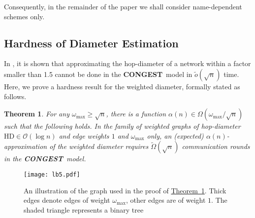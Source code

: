 \documentclass[letterpaper,11pt]{article}
\newcommand{\namedref}[2]{\hyperref[#2]{#1~\ref*{#2}}}
\newcommand{\theoremref}[1]{\namedref{Theorem}{#1}}
\newtheorem{theorem}{Theorem}[section]
\newcommand{\BO}{\mathcal{O}}
\newcommand{\CONGEST}{\textbf{CONGEST}}
\newcommand{\HD}{\mathrm{HD}}
\begin{document}
Consequently, in the remainder of the paper we shall consider
name-dependent schemes only.


\subsection{Hardness of Diameter Estimation}
\label{sec:lb_diam}

In \cite{FHW-12}, it is shown that approximating the hop-diameter of a
network within a factor smaller than 1.5 cannot be done in the \CONGEST\ model
in $\tilde o(\sqrt n)$ time. Here, we prove a hardness result for the weighted
diameter, formally stated as follows.
\begin{theorem}\label{thm-lb-diam}
For any $\omega_{\max}\geq \sqrt{n}$, there is a function $\alpha(n)\in
\Omega(\omega_{\max}/\sqrt{n})$ such that the following holds. In the family of
weighted graphs of hop-diameter $\HD\in \BO(\log n)$ and edge weights $1$ and
$\omega_{\max}$ only, an (expected) $\alpha(n)$-approximation of the weighted
diameter requires $\tilde\Omega(\sqrt n)$ communication rounds in the \CONGEST\
model.
\end{theorem}
\begin{figure}[t]
  \centering \texttt{[image: lb5.pdf]} \caption{An
    illustration of  the graph
  used in the proof of
    \theoremref{thm-lb-diam}. Thick edges denote edges of weight
    $\omega_{\max}$, other edges are of weight $1$. The shaded
    triangle represents a binary tree}
  \label{fig-lb5}
\end{figure}
\end{document}
